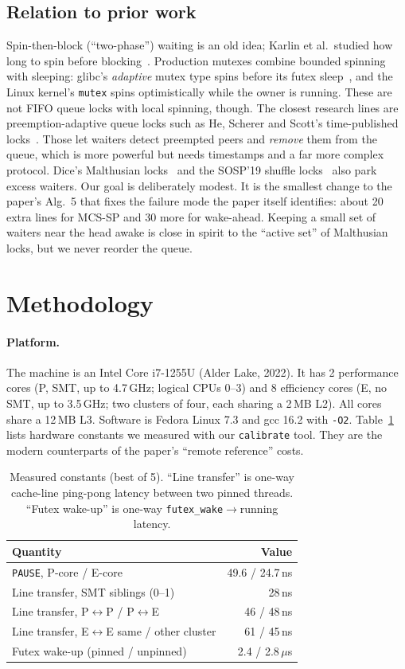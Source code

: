 \documentclass[10pt,twocolumn]{article}
\newcommand{\mcssp}{\textsc{MCS-SP}}
\begin{document}
\subsection{Relation to prior work}
Spin-then-block (``two-phase'') waiting is an old idea; Karlin et al.\ studied how long to spin before
blocking~\cite{karlin91}. Production mutexes combine bounded spinning with sleeping: glibc's
\emph{adaptive} mutex type spins before its futex sleep~\cite{futex}, and the Linux kernel's \texttt{mutex}
spins optimistically while the owner is running. These are not FIFO queue locks with local spinning, though.
The closest research lines are preemption-adaptive queue locks such as He, Scherer and Scott's
time-published locks~\cite{tp05}. Those let waiters detect preempted peers and \emph{remove} them from the
queue, which is more powerful but needs timestamps and a far more complex protocol. Dice's Malthusian
locks~\cite{malthusian} and the SOSP'19 shuffle locks~\cite{shfl} also park excess waiters. Our goal is
deliberately modest. It is the smallest change to the paper's Alg.~5 that fixes the failure mode the
paper itself identifies: about 20 extra lines for \mcssp{} and 30 more for wake-ahead. Keeping a small set
of waiters near the head awake is close in spirit to the ``active set'' of Malthusian locks, but we never
reorder the queue.

\section{Methodology}
\label{sec:method}
\paragraph{Platform.} The machine is an Intel Core i7-1255U (Alder Lake, 2022). It has 2 performance cores
(P, SMT, up to 4.7\,GHz; logical CPUs 0--3) and 8 efficiency cores (E, no SMT, up to 3.5\,GHz; two clusters
of four, each sharing a 2\,MB L2). All cores share a 12\,MB L3. Software is Fedora Linux 7.3 and gcc 16.2
with \texttt{-O2}. Table~\ref{tab:calib} lists hardware constants we measured with our \texttt{calibrate}
tool. They are the modern counterparts of the paper's ``remote reference'' costs.

\begin{table}[t]\centering\small
\caption{Measured constants (best of 5). ``Line transfer'' is one-way cache-line ping-pong latency
between two pinned threads. ``Futex wake-up'' is one-way \texttt{futex\_wake}$\to$running latency.}
\label{tab:calib}
\begin{tabular}{@{}lr@{}}\toprule
Quantity & Value\\\midrule
\texttt{PAUSE}, P-core / E-core & 49.6 / 24.7\,ns\\
Line transfer, SMT siblings (0--1) & 28\,ns\\
Line transfer, P$\leftrightarrow$P / P$\leftrightarrow$E & 46 / 48\,ns\\
Line transfer, E$\leftrightarrow$E same / other cluster & 61 / 45\,ns\\
Futex wake-up (pinned / unpinned) & 2.4 / 2.8\,$\mu$s\\\bottomrule
\end{tabular}
\end{table}
\end{document}
